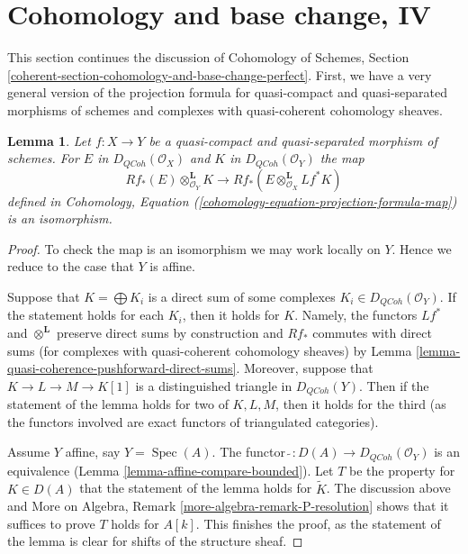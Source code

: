 \documentclass{stacks-project}
\theoremstyle{plain}
\newtheorem{lemma}[subsection]{Lemma}
\theoremstyle{definition}
\theoremstyle{remark}
\numberwithin{equation}{subsection}
\def\Spec{\mathop{\mathrm{Spec}}}
\def\QCoh{\mathit{QCoh}}
\begin{document}
\section{Cohomology and base change, IV}
\label{section-cohomology-and-base-change-perfect}

\noindent
This section continues the discussion of
Cohomology of Schemes, Section
\ref{coherent-section-cohomology-and-base-change-perfect}.
First, we have a very general version of the projection
formula for quasi-compact and quasi-separated morphisms of schemes 
and complexes with quasi-coherent cohomology sheaves.

\begin{lemma}
\label{lemma-cohomology-base-change}
Let $f : X \to Y$ be a quasi-compact and quasi-separated morphism
of schemes. For $E$ in $D_\QCoh(\mathcal{O}_X)$ and
$K$ in $D_\QCoh(\mathcal{O}_Y)$ the map
$$
Rf_*(E) \otimes_{\mathcal{O}_Y}^\mathbf{L} K
\longrightarrow
Rf_*(E \otimes_{\mathcal{O}_X}^\mathbf{L} Lf^*K)
$$
defined in
Cohomology, Equation (\ref{cohomology-equation-projection-formula-map})
is an isomorphism.
\end{lemma}

\begin{proof}
To check the map is an isomorphism we may work locally on $Y$.
Hence we reduce to the case that $Y$ is affine.

\medskip\noindent
Suppose that $K = \bigoplus K_i$ is a direct
sum of some complexes $K_i \in D_\QCoh(\mathcal{O}_Y)$.
If the statement holds for each $K_i$, then it holds for $K$.
Namely, the functors $Lf^*$ and $\otimes^\mathbf{L}$ preserve
direct sums by construction and $Rf_*$ commutes with direct sums
(for complexes with quasi-coherent cohomology sheaves) by
Lemma \ref{lemma-quasi-coherence-pushforward-direct-sums}.
Moreover, suppose that $K \to L \to M \to K[1]$ is a distinguished
triangle in $D_\QCoh(Y)$. Then if the statement of the
lemma holds for two of $K, L, M$, then it holds for the third
(as the functors involved are exact functors of triangulated categories).

\medskip\noindent
Assume $Y$ affine, say $Y = \Spec(A)$. The functor
$\widetilde{\ } : D(A) \to D_\QCoh(\mathcal{O}_Y)$ is an equivalence
(Lemma \ref{lemma-affine-compare-bounded}).
Let $T$ be the property for $K \in D(A)$ that
the statement of the lemma holds for $\widetilde{K}$.
The discussion above and
More on Algebra, Remark \ref{more-algebra-remark-P-resolution}
shows that it suffices to prove $T$ holds for $A[k]$.
This finishes the proof, as the statement of the lemma
is clear for shifts of the structure sheaf.
\end{proof}
\end{document}

